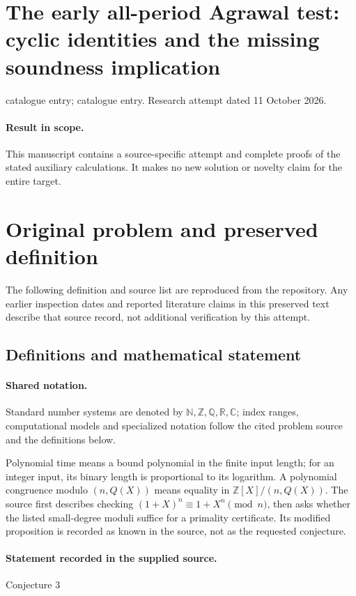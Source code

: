 \documentclass[11pt]{article}
\begin{document}
\section*{The early all-period Agrawal test: cyclic identities and the missing soundness implication}
\noindent catalogue entry; catalogue entry. Research attempt dated 11 October 2026.
\paragraph{Result in scope.}This manuscript contains a source-specific attempt and complete proofs of the stated auxiliary calculations. It makes no new solution or novelty claim for the entire target.
\section{Original problem and preserved definition}
The following definition and source list are reproduced from the repository. Any earlier inspection dates and reported literature claims in this preserved text describe that source record, not additional verification by this attempt.
\subsection{Definitions and mathematical statement}

\paragraph{Shared notation.}Standard number systems are denoted by $\mathbb N,\mathbb Z,\mathbb Q,\mathbb R,\mathbb C$; index ranges, computational models and specialized notation follow the cited problem source and the definitions below.


Polynomial time means a bound polynomial in the finite input length; for an integer input, its binary length is proportional to its logarithm. A polynomial congruence modulo $(n,Q(X))$ means equality in $\mathbb Z[X]/(n,Q(X))$. The source first describes checking $(1+X)^n\equiv1+X^n\pmod n$, then asks whether the listed small-degree moduli suffice for a primality certificate. Its modified proposition is recorded as known in the source, not as the requested conjecture.
\paragraph{Statement recorded in the supplied source.}
Conjecture 3
\end{document}
